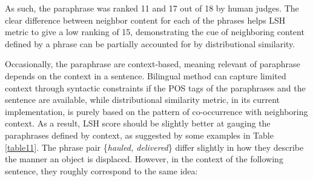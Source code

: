 \documentclass[11pt]{article}
\newcommand{\mnote}[1]{\marginpar{\raggedleft\footnotesize\itshape#1}}
\begin{document}
As such, the paraphrase was ranked 11 and 17 out of 18 by human judges. The clear difference between neighbor content for each of the phrases helps LSH metric to give a low ranking of 15, demonstrating the cue of neighboring content defined by a phrase can be partially accounted for by distributional similarity.


\mnote{effect by context} %
Occasionally, the paraphrase are context-based, meaning relevant of paraphrase depends on the context in a sentence. Bilingual method can capture limited context through syntactic constraints if the POS tags of the paraphrases and the sentence are available, while distributional similarity metric, in its current implementation, is purely based on the pattern of co-occurrence with neighboring context. As a result, LSH score should be slightly better at gauging the paraphrases defined by context, as suggested by some examples in Table \ref{table11}. The phrase pair \{\emph{hauled, delivered}\} differ slightly in how they describe the manner an object is displaced. However, in the context of the following sentence, they roughly correspond to the same idea:
\end{document}
